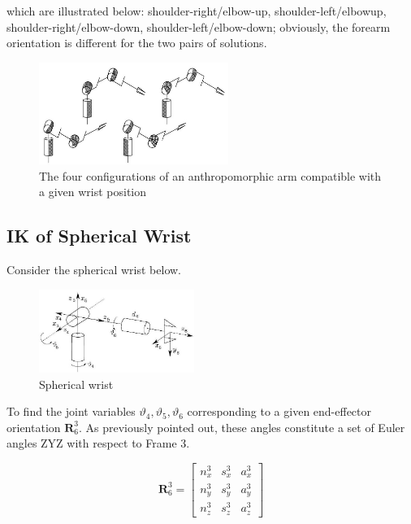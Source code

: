 \documentclass[10pt]{article}
\begin{document}
\noindent
which are illustrated below: shoulder-right/elbow-up, shoulder-left/elbowup, shoulder-right/elbow-down, shoulder-left/elbow-down; obviously, the forearm orientation is different for the two pairs of solutions. 


\begin{figure}[H]
    \centering
    \includegraphics[max width=0.55\textwidth]{./kinematics/4IK_solutions_anthropomorphic_arm}
    \caption{The four configurations of an anthropomorphic arm compatible with a given wrist position}
    \label{fig:enter-label}
\end{figure}


\subsection{IK of Spherical Wrist}
Consider the spherical wrist below.

\begin{figure}[H]
    \centering
   \includegraphics[max width=0.45\textwidth]{./kinematics/spherical_wrist}
    \caption{Spherical wrist}
    \label{c1.l2.fig.spherical-wrist}
\end{figure}

\noindent
To find the joint variables $\vartheta_{4}, \vartheta_{5}, \vartheta_{6}$ corresponding to a given end-effector orientation $\boldsymbol{R}_{6}^{3}$. As previously pointed out, these angles constitute a set of Euler angles ZYZ with respect to Frame 3.


$$
\boldsymbol{R}_{6}^{3}=\left[\begin{array}{rrr}
n_{x}^{3} & s_{x}^{3} & a_{x}^{3} \\
n_{y}^{3} & s_{y}^{3} & a_{y}^{3} \\
n_{z}^{3} & s_{z}^{3} & a_{z}^{3}
\end{array}\right]
$$
\end{document}
